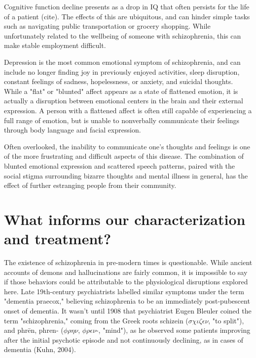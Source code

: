 \documentclass[12pt,twoside]{reedthesis}
\begin{document}
	Cognitive function decline presents as a drop in IQ that often persists for the life of a patient (cite). The effects of this are ubiquitous, and can hinder simple tasks such as navigating public transportation or grocery shopping. While unfortunately related to the wellbeing of someone with schizophrenia, this can make stable employment difficult. 
	
	 Depression is the most common emotional symptom of schizophrenia, and can include no longer finding joy in previously enjoyed activities, sleep disruption, constant feelings of sadness, hopelessness, or anxiety, and suicidal thoughts. While a "flat" or "blunted" affect appears as a state of flattened emotion, it is actually a disruption between emotional centers in the brain and their external expression. A person with a flattened affect is often still capable of experiencing a full range of emotion, but is unable to nonverbally communicate their feelings through body language and facial expression. 
	
	Often overlooked, the inability to communicate one's thoughts and feelings is one of the more frustrating and difficult aspects of this disease. The combination of blunted emotional expression and scattered speech patterns, paired with the social stigma surrounding bizarre thoughts and mental illness in general, has the effect of further estranging people from their community. 
	
	\section{What informs our characterization and treatment?}
	The existence of schizophrenia in pre-modern times is questionable. While ancient accounts of demons and hallucinations are fairly common, it is impossible to say if those behaviors could be attributable to the physiological disruptions explored here. Late 19th-century psychiatrists labelled similar symptoms under the term "dementia praecox," believing schizophrenia to be an immediately post-pubescent onset of dementia. It wasn't until 1908 that psychiatrist Eugen Bleuler coined the term "schizophrenia," coming from the Greek roots schizein ($\sigma \chi \iota \zeta \epsilon \nu$, "to split"), and phr\=en, phren- ($\phi \rho \eta \nu$, $\phi \rho \epsilon \nu$-, "mind"), as he observed some patients improving after the initial psychotic episode and not continuously declining, as in cases of dementia (Kuhn, 2004). 
	
\end{document}
